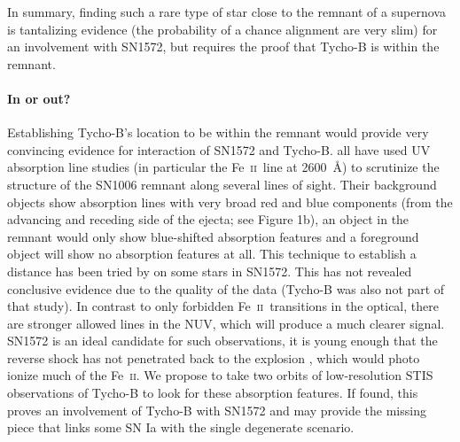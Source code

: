 \documentclass[12pt]{article}
\newcommand{\feii}{Fe~\textsc{ii}}
\begin{document}
In summary, finding such a rare type of star close to the remnant of a supernova is tantalizing evidence (the probability of a chance alignment are very slim) for an involvement with SN1572, but requires the proof that Tycho-B is within the remnant.

\vspace{-5mm}
\paragraph{In or out?}
Establishing Tycho-B's location to be within the remnant would provide very convincing evidence for interaction of SN1572 and Tycho-B. 
\cite{1988ApJ...327..164F,1993ApJ...416..247W, 2005ApJ...624..189W} all have used UV absorption line studies (in particular the \feii\ line at 2600~\AA) to scrutinize the structure of the SN1006 remnant along several lines of sight. Their background objects show absorption lines with very broad red and blue components (from the advancing and receding side of the ejecta; see Figure 1b), an object in the remnant would only show blue-shifted absorption features and a foreground object will show no absorption features at all. This technique to establish a distance has been tried by \citet{2007PASJ...59..811I} on some stars in SN1572. This has not revealed conclusive evidence due to the quality of the data (Tycho-B was also not part of that study). In contrast to only forbidden \feii\ transitions in the optical, there are stronger allowed lines in the NUV, which will produce a much clearer signal. SN1572 is an ideal candidate for such observations, it is young enough that the reverse shock has not penetrated back to the explosion \citep[current radius 183\arcsec;][]{2005ApJ...634..376W}, which would photo ionize much of the \feii. We propose to take two orbits of low-resolution STIS observations of Tycho-B to look for these absorption features. If found,  this proves an involvement of Tycho-B with SN1572 and may provide the missing piece that links some SN Ia with the single degenerate scenario.
\end{document}
